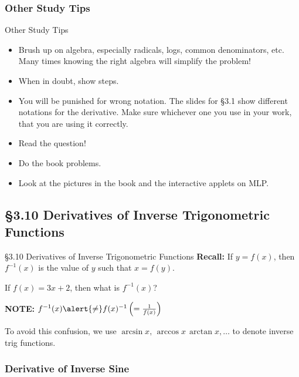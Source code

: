 \documentclass[cal1spr16Lectures.tex]{subfiles}
\begin{document}
\subsubsection{Other Study Tips}

\begin{frame}{\small Other Study Tips}
\footnotesize
\begin{itemize}
\item Brush up on algebra, especially radicals, logs, common denominators, etc.  Many times knowing the right algebra will simplify the problem!
\item When in doubt, show steps.  
\item You will be punished for wrong notation.  The slides for \S 3.1 show different notations for the derivative.  Make sure whichever one you use in your work, that you are using it correctly.
\item Read the question!  
\item Do the book problems.
\item Look at the pictures in the book and the interactive applets on MLP.
\end{itemize}
\end{frame}

\subsection[3.10 Derivatives of Inverse Trigonometric Functions]{\S 3.10 Derivatives of Inverse Trigonometric Functions}

\begin{frame}{\S 3.10 Derivatives of Inverse Trigonometric Functions}{}\small
{\bf Recall:} If $y=f(x)$, then $f^{-1}(x)$ is the value of $y$ such that $x=f(y)$.
\begin{ex} If $f(x)=3x+2$, then what is $f^{-1}(x)$? \end{ex}
{\bf NOTE:}  $f^{-1}(x)\alert{\neq} f(x)^{-1}\textstyle\left(=\frac{1}{f(x)}\right)$

\vspace{0.5pc}
To avoid this confusion, we use $\arcsin{x},\,\arccos{x}\,\arctan{x},\dots$ to denote inverse trig functions.
\end{frame}

\subsubsection{Derivative of Inverse Sine}
\end{document}
